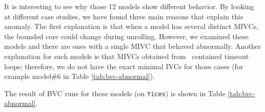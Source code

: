       It is interesting to see why those 12 models show different behavior. By looking at different case studies, we have found three main reasons that explain this anomaly.  The first explanation is that when a model has several distinct MIVCs, the bounded core could change during unrolling. However, we examined these models and there are ones with a single MIVC that behaved abnormally. Another explanation for such models is that MIVCs obtained from \aivcalg ~contained timeout loops; therefore, we do not have the exact minimal IVCs for those cases (for example model\#6 in Table \ref{tab:bvc-abnormal}).

       The result of BVC runs for these models (on \texttt{Yices}) is shown in Table \ref{tab:bvc-abnormal}.






